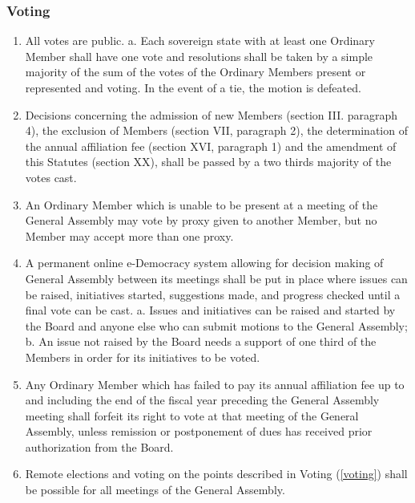\begin{frame}

\frametitle{Voting}
\label{voting}

\begin{enumerate}
\item All votes are public.
 a. Each sovereign state with at least one Ordinary Member shall have one vote and resolutions shall be taken by a simple majority of the sum of the votes of the Ordinary Members present or represented and voting. In the event of a tie, the motion is defeated.

\item Decisions concerning the admission of new Members (section III. paragraph 4), the exclusion of Members (section VII, paragraph 2), the determination of the annual affiliation fee (section XVI, paragraph 1) and the amendment of this Statutes (section XX), shall be passed by a two thirds majority of the votes cast.

\item An Ordinary Member which is unable to be present at a meeting of the General Assembly may vote by proxy given to another Member, but no Member may accept more than one proxy.

\item A permanent online e-{}Democracy system allowing for decision making of General Assembly between its meetings shall be put in place where issues can be raised, initiatives started, suggestions made, and progress checked until a final vote can be cast.
 a. Issues and initiatives can be raised and started by the Board and anyone else who can submit motions to the General Assembly;
 b. An issue not raised by the Board needs a support of one third of the Members in order for its initiatives to be voted.

\item Any Ordinary Member which has failed to pay its annual affiliation fee up to and including the end of the fiscal year preceding the General Assembly meeting shall forfeit its right to vote at that meeting of the General Assembly, unless remission or postponement of dues has received prior authorization from the Board.

\item Remote elections and voting on the points described in Voting (\autoref{voting}) shall be possible for all meetings of the General Assembly.

\end{enumerate}

\end{frame}

